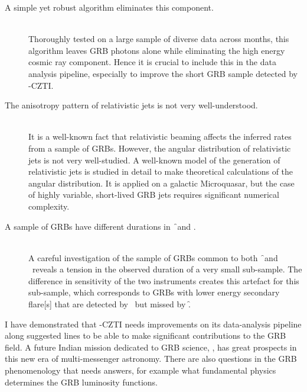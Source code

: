\begin{description}
\item[A simple yet robust algorithm eliminates this component.] \hfill \\
Thoroughly tested on a large sample of diverse data across months, this algorithm leaves GRB photons alone while eliminating the high energy cosmic ray component. Hence it is crucial to include this in the data analysis pipeline, especially to improve the short GRB sample detected by \AS -CZTI.

\item[The anisotropy pattern of relativistic jets is not very well-understood.] \hfill \\
It is a well-known fact that relativistic beaming affects the inferred rates from a sample of GRBs. However, the angular distribution of relativistic jets is not very well-studied. A well-known model of the generation of relativistic jets is studied in detail to make theoretical calculations of the angular distribution. It is applied on a galactic Microquasar, but the case of highly variable, short-lived GRB jets requires significant numerical complexity.

\item[A sample of GRBs have different durations in \f\ and \s.] \hfill \\
A careful investigation of the sample of GRBs common to both \f\ and \s\ reveals a tension in the observed duration of a very small sub-sample. The difference in sensitivity of the two instruments creates this artefact for this sub-sample, which corresponds to GRBs with lower energy secondary flare[s] that are detected by \s\ but missed by \f.

\end{description}


I have demonstrated that \AS -CZTI needs improvements on its data-analysis pipeline along suggested lines to be able to make significant contributions to the GRB field. A future Indian mission dedicated to GRB science, \D, has great prospects in this new era of multi-messenger astronomy. There are also questions in the GRB phenomenology that needs answers, for example what fundamental physics determines the GRB luminosity functions.

